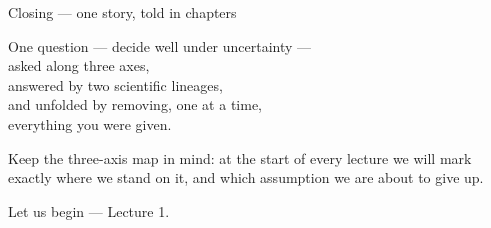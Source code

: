 \documentclass[10pt, aspectratio=169]{beamer}
\begin{document}
\begin{frame}{Closing --- one story, told in chapters}
\vfill
\begin{center}\large
One question --- decide well under uncertainty ---\\[6pt]
asked along three axes,\\[4pt]
answered by two scientific lineages,\\[4pt]
and unfolded by removing, one at a time,\\[4pt]
everything you were given.
\end{center}
\vfill
\pause
\footnotesize
Keep the three-axis map in mind: at the start of every lecture we will mark exactly where we stand on it, and which assumption we are about to give up.
\end{frame}

\begin{frame}[standout]
Let us begin --- Lecture 1.
\end{frame}
\end{document}
